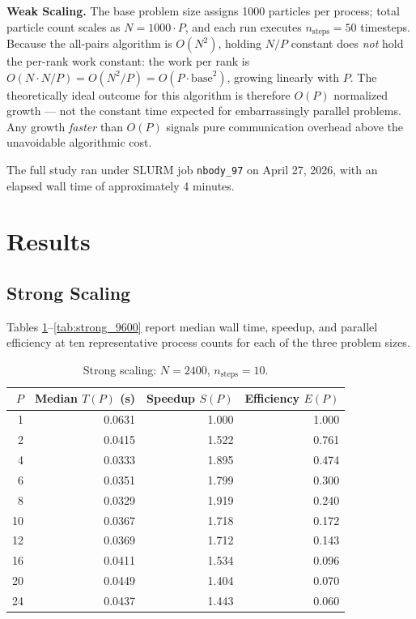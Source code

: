 \documentclass[11pt]{article}
\begin{document}
\textbf{Weak Scaling.} The base problem size assigns 1000 particles per process; total particle count scales as $N = 1000 \cdot P$, and each run executes $n_\text{steps} = 50$ timesteps. Because the all-pairs algorithm is $O(N^2)$, holding $N/P$ constant does \emph{not} hold the per-rank work constant: the work per rank is $O(N \cdot N/P) = O(N^2/P) = O(P \cdot \text{base}^2)$, growing linearly with $P$. The theoretically ideal outcome for this algorithm is therefore $O(P)$ normalized growth — not the constant time expected for embarrassingly parallel problems. Any growth \emph{faster} than $O(P)$ signals pure communication overhead above the unavoidable algorithmic cost.

The full study ran under SLURM job \texttt{nbody\_97} on April 27, 2026, with an elapsed wall time of approximately 4 minutes.

\section{Results}

\subsection{Strong Scaling}

Tables \ref{tab:strong_2400}--\ref{tab:strong_9600} report median wall time, speedup, and parallel efficiency at ten representative process counts for each of the three problem sizes.

\begin{table}[H]
  \centering
  \caption{Strong scaling: $N = 2400$, $n_\text{steps} = 10$.}
  \label{tab:strong_2400}
  \begin{tabular}{r r r r}
    \toprule
    $P$ & Median $T(P)$ (s) & Speedup $S(P)$ & Efficiency $E(P)$ \\
    \midrule
    1  & 0.0631 & 1.000 & 1.000 \\
    2  & 0.0415 & 1.522 & 0.761 \\
    4  & 0.0333 & 1.895 & 0.474 \\
    6  & 0.0351 & 1.799 & 0.300 \\
    8  & 0.0329 & 1.919 & 0.240 \\
    10 & 0.0367 & 1.718 & 0.172 \\
    12 & 0.0369 & 1.712 & 0.143 \\
    16 & 0.0411 & 1.534 & 0.096 \\
    20 & 0.0449 & 1.404 & 0.070 \\
    24 & 0.0437 & 1.443 & 0.060 \\
    \bottomrule
  \end{tabular}
\end{table}
\end{document}
